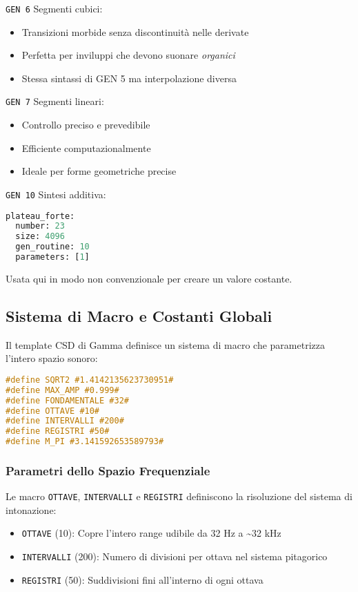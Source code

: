 \texttt{GEN 6} Segmenti cubici:
\begin{itemize}
    \item Transizioni morbide senza discontinuità nelle derivate
    \item Perfetta per inviluppi che devono suonare \textit{organici}
    \item Stessa sintassi di GEN 5 ma interpolazione diversa
\end{itemize}

\texttt{GEN 7} Segmenti lineari:
\begin{itemize}
    \item Controllo preciso e prevedibile
    \item Efficiente computazionalmente
    \item Ideale per forme geometriche precise
\end{itemize}

\texttt{GEN 10} Sintesi additiva:
\begin{lstlisting}[language=Python]
plateau_forte:
  number: 23
  size: 4096
  gen_routine: 10
  parameters: [1]
\end{lstlisting}
Usata qui in modo non convenzionale per creare un valore costante.
\subsection{Sistema di Macro e Costanti Globali}
Il template CSD di Gamma definisce un sistema di macro che parametrizza l'intero spazio sonoro:

\begin{lstlisting}[language=C]
#define SQRT2 #1.4142135623730951#
#define MAX_AMP #0.999#
#define FONDAMENTALE #32#
#define OTTAVE #10#
#define INTERVALLI #200#
#define REGISTRI #50#
#define M_PI #3.141592653589793#
\end{lstlisting}
\subsubsection{Parametri dello Spazio Frequenziale}
Le macro \texttt{OTTAVE}, \texttt{INTERVALLI} e \texttt{REGISTRI} definiscono la risoluzione del sistema di intonazione:

\begin{itemize}
    \item \texttt{OTTAVE} (10): Copre l'intero range udibile da 32 Hz a \textasciitilde{}32 kHz
    \item \texttt{INTERVALLI} (200): Numero di divisioni per ottava nel sistema pitagorico
    \item \texttt{REGISTRI} (50): Suddivisioni fini all'interno di ogni ottava
\end{itemize}

